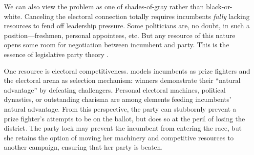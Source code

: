 \documentclass[letter,12pt]{article}
\begin{document}




We can also view the problem as one of shades-of-gray rather than black-or-white. Canceling the electoral connection totally requires incumbents \emph{fully} lacking resources to fend off leadership pressure. Some politicians are, no doubt, in such a position---freshmen, personal appointees, etc. But any resource of this nature opens some room for negotiation between incumbent and party. This is the essence of legislative party theory \citep{cox.mccubbins.2007leviath2nd,aldrich.rohdeCPG2001}.

One resource is electoral competitiveness. \citet{zallerprizeFighters} models incumbents as prize fighters and the electoral arena as selection mechanism: winners demonstrate their ``natural advantage'' by defeating challengers. Personal electoral machines, political dynasties, or outstanding charisma are among elements feeding incumbents' natural advantage. From this perspective, the party can stubbornly prevent a prize fighter's attempts to be on the ballot, but does so at the peril of losing the district. The party lock may prevent the incumbent from entering the race, but she retains the option of moving her machinery and competitive resources to another campaign, ensuring that her party is beaten.
\end{document}
